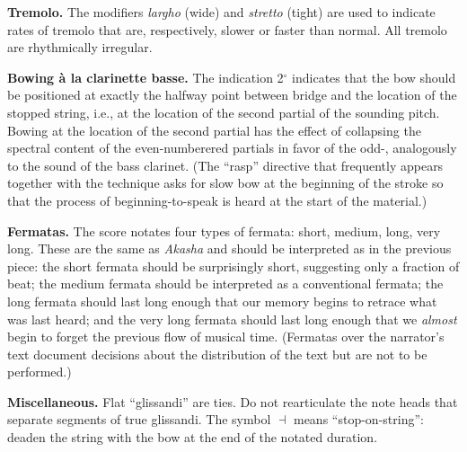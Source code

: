 \textbf{Tremolo.} The modifiers \textit{largho} (wide) and \textit{stretto} (tight) are
used to indicate rates of tremolo that are, respectively, slower or faster than normal.
All tremolo are rhythmically irregular.

\textbf{Bowing à la clarinette basse.} The indication 2$^\circ$ indicates that the bow
should be positioned at exactly the halfway point between bridge and the location of the
stopped string, i.e., at the location of the second partial of the sounding pitch. Bowing
at the location of the second partial has the effect of collapsing the spectral content
of the even-numberered partials in favor of the odd-, analogously to the sound of the
bass clarinet. (The ``rasp'' directive that frequently appears together with the
technique asks for slow bow at the beginning of the stroke so that the process of
beginning-to-speak is heard at the start of the material.)

\textbf{Fermatas.} The score notates four types of fermata: short, medium, long, very
long. These are the same as \textit{Akasha} and should be interpreted as in the previous
piece: the short fermata should be surprisingly short, suggesting only a fraction of
beat; the medium fermata should be interpreted as a conventional fermata; the long
fermata should last long enough that our memory begins to retrace what was last heard;
and the very long fermata should last long enough that we \textit{almost} begin to forget
the previous flow of musical time. (Fermatas over the narrator's text document decisions
about the distribution of the text but are not to be performed.)

\textbf{Miscellaneous.} Flat ``glissandi'' are ties. Do not rearticulate the note heads
that separate segments of true glissandi. The symbol $\dashv$ means ``stop-on-string'':
deaden the string with the bow at the end of the notated duration.
